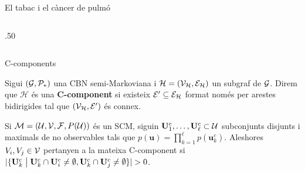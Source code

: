 \documentclass{bestbeamer}
\begin{document}
\begin{frame}{El tabac i el càncer de pulmó}
\begin{columns}[T,onlytextwidth]
\begin{column}{.50\textwidth}
    \end{column}
  \end{columns}
\end{frame}


\begin{frame}{C-components}\label{frame:def-formal-Ccomponent}
\begin{definition}\label{def:c_component}
Sigui $(\mathcal{G},\mathcal{P}_*)$ una CBN semi-Markoviana i $\mathcal{H}=(\mathcal{V}_{\mathcal{H}},\mathcal{E}_{\mathcal{H}})$ un subgraf de $\mathcal{G}$. Direm que $\mathcal{H}$ és una \textbf{C-component} si existeix $\mathcal{E}'\subseteq \mathcal{E}_{\mathcal{H}}$ format només per arestes bidirigides tal que $(\mathcal{V}_{\mathcal{H}},\mathcal{E}')$ és connex.
\end{definition}
\begin{definition}\label{note:CcomponentSCM}
Si $\mathcal{M}=(\mathcal{U},\mathcal{V},\mathcal{F},P(\mathcal{U}))$ és un SCM, siguin $\mathbf{U}^c_1,\dotsc,\mathbf{U}^c_\ell\subset\mathcal{U}$ subconjunts disjunts i maximals de no observables tals que $p(\mathbf u)=\prod_{k=1}^\ell p(\mathbf u^c_k)$. Aleshores $V_i,V_j\in\mathcal{V}$ pertanyen a la mateixa C-component si $|\{\mathbf{U}_k^c\talque\mathbf{U}_k^c\cap\mathbf{U}_i^c\neq\emptyset,\mathbf{U}_k^c\cap\mathbf{U}_j^c\neq\emptyset\}|>0$.
\end{definition}
\vfill
\hfill{}
\end{frame}
\end{document}

